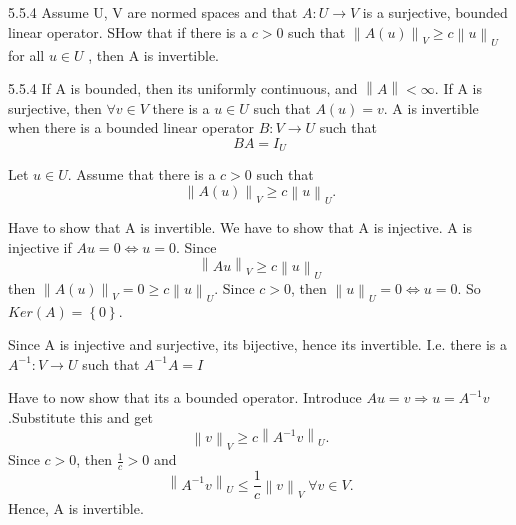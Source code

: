 \documentclass[a4paper,norsk]{article}
\renewcommand{\geq}{\geqslant}
\renewcommand{\leq}{\leqslant}
\begin{document}
\begin{oppgavebox}{5.5.4}{}
Assume U, V are normed spaces and that $ A : U \to V $ is a surjective, bounded linear operator. SHow that if there is a $ c > 0 $ such that $ \left\lVert A(u) \right\rVert _V \geq c \left\lVert u \right\rVert_U  $ for all $ u \in U $ , then A is invertible.

\begin{proofbox}{5.5.4}{}
    If A is bounded, then its uniformly continuous, and $ \left\lVert A \right\rVert < \infty $. If A is surjective, then $ \forall v \in V $ there is a $ u \in U $ such that $ A(u) = v $. A is invertible when there is a bounded linear operator $ B : V \to U $ such that
    \[
        BA = I_U
    \]

    Let $ u \in U $. Assume that there is a $ c > 0 $ such that
    \[
        \left\lVert A(u) \right\rVert_V \geq c \left\lVert u \right\rVert _U.
    \]

    Have to show that A is invertible. We have to show that A is injective. A is injective if $ Au = 0 \iff u = 0 $. Since 
    \[
        \left\lVert Au \right\rVert _V \geq c \left\lVert u \right\rVert _U
    \]
    then $ \left\lVert A(u) \right\rVert _V = 0 \geq c \left\lVert u \right\rVert_U  $. Since $ c > 0 $, then $ \left\lVert u \right\rVert _U = 0 \iff u = 0 $. So $ Ker(A) = \left\{ 0 \right\}  $. 


    Since A is injective and surjective, its bijective, hence its invertible. I.e. there is a $ A ^{-1} : V \to U  $ such that $ A ^{-1} A = I  $


    Have to now show that its a bounded operator. Introduce $ Au = v \Rightarrow u = A ^{-1} v  $.Substitute this and get
    \[
        \left\lVert v  \right\rVert _V \geq c \left\lVert A ^{-1} v  \right\rVert_U.
    \]
    Since $ c > 0 $, then $ \frac{ 1 }{ c }> 0 $ and
    \[
        \left\lVert A ^{-1} v  \right\rVert _U \leq \frac{ 1 }{ c } \left\lVert v \right\rVert_V \; \forall v \in V.
    \]
    Hence, A is invertible.
\end{proofbox}
\end{oppgavebox}
\end{document}
